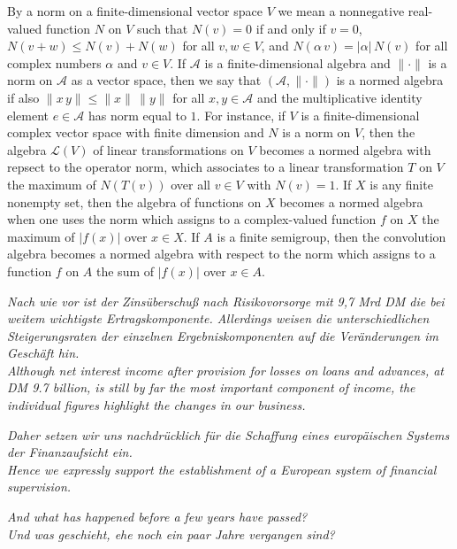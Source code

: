 \documentclass[12pt,leqno,draft]{article}
\begin{document}
	By a norm on a finite-dimensional vector space $V$ we mean a
nonnegative real-valued function $N$ on $V$ such that $N(v) = 0$ if
and only if $v = 0$, $N(v + w) \le N(v) + N(w)$ for all $v, w \in V$,
and $N(\alpha \, v) = |\alpha| \, N(v)$ for all complex numbers
$\alpha$ and $v \in V$.  If $\mathcal{A}$ is a finite-dimensional
algebra and $\|\cdot \|$ is a norm on $\mathcal{A}$ as a vector space,
then we say that $(\mathcal{A}, \|\cdot \|)$ is a normed algebra if
also $\|x \, y \| \le \|x\| \, \|y\|$ for all $x, y \in \mathcal{A}$
and the multiplicative identity element $e \in \mathcal{A}$ has norm
equal to $1$.  For instance, if $V$ is a finite-dimensional complex
vector space with finite dimension and $N$ is a norm on $V$, then the
algebra $\mathcal{L}(V)$ of linear transformations on $V$ becomes a
normed algebra with repsect to the operator norm, which associates to
a linear transformation $T$ on $V$ the maximum of $N(T(v))$ over all
$v \in V$ with $N(v) = 1$.  If $X$ is any finite nonempty set, then
the algebra of functions on $X$ becomes a normed algebra when one uses
the norm which assigns to a complex-valued function $f$ on $X$ the
maximum of $|f(x)|$ over $x \in X$.  If $A$ is a finite semigroup,
then the convolution algebra becomes a normed algebra with respect to
the norm which assigns to a function $f$ on $A$ the sum of $|f(x)|$
over $x \in A$.





\ea \label{ex:culo:21}
  \ea \textit{Nach wie vor ist der Zinsüberschuß nach Risikovorsorge mit 9,7 Mrd DM die bei   weitem wichtigste Ertragskomponente. Allerdings weisen die unterschiedlichen   Steigerungsraten der einzelnen Ergebniskomponenten auf die Veränderungen im Geschäft hin. } \\
   \ex \textit{Although net interest income after provision for losses on loans and advances, at DM 9.7 billion, is still by far the most important component of income, the individual figures highlight the changes in our business.}
   \z
\z


\ea \label{ex:culo:22}
   \ea \textit{Daher setzen wir uns nachdrücklich für die Schaffung eines europäischen Systems der Finanzaufsicht ein.}  \\
    \ex \textit{Hence we expressly support the establishment of a European system of financial   supervision.} 
    \z
\z



\ea \label{ex:culo:23}
    \ea \textit{And what has happened before a few years have passed?} \\
     \ex \textit{Und was geschieht, ehe noch ein paar Jahre vergangen sind?}
     \z
\z
 
\end{document}
